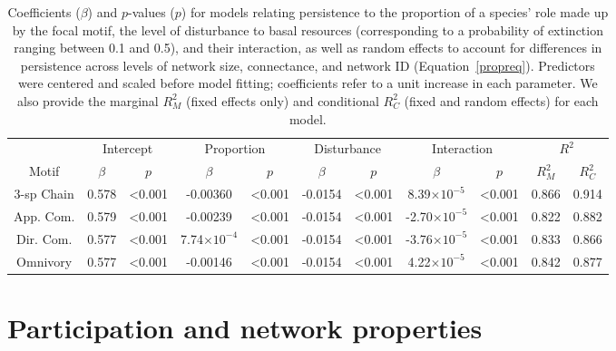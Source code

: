 \documentclass[12pt]{article}
\begin{document}
\begin{spacing}{2.0}
    \begin{table}[h!]
        \centering
        \caption{Coefficients ($\beta$) and $p$-values ($p$) for models relating persistence to the proportion of a species' role made up by the focal motif, the level of disturbance to basal resources (corresponding to a probability of extinction ranging between 0.1 and 0.5), and their interaction, as well as random effects to account for differences in persistence across levels of network size, connectance, and network ID  (Equation~\ref{propreq}). Predictors were centered and scaled before model fitting; coefficients refer to a unit increase in each parameter. We also provide the marginal $R^2_M$ (fixed effects only) and conditional $R^2_C$ (fixed and random effects) for each model.}
        \label{tab:proportion}                \footnotesize
        \begin{tabular}{c|c c | c c | c c | c c | c c |}
        & \multicolumn{2}{c|}{Intercept} & \multicolumn{2}{c|}{Proportion} & \multicolumn{2}{c|}{Disturbance} & \multicolumn{2}{c|}{Interaction} & \multicolumn{2}{c|}{$R^2$} \\
        Motif & $\beta$ & $p$ & $\beta$ & $p$ & $\beta$ & $p$ & $\beta$ & $p$ & $R^2_M$ & $R^2_C$ \\
        \hline
        3-sp Chain & 0.578 & \textless0.001 & -0.00360 & \textless0.001 & -0.0154 & \textless0.001 & 8.39$\times10^{-5}$& \textless0.001 & 0.866 & 0.914 \\
        App. Com. & 0.579 & \textless0.001 & -0.00239 & \textless0.001 & -0.0154 & \textless0.001 & -2.70$\times10^{-5}$ & \textless0.001 & 0.822 & 0.882 \\
        Dir. Com. & 0.577 & \textless0.001 & 7.74$\times10^{-4}$ & \textless0.001 & -0.0154 & \textless0.001 & -3.76$\times10^{-5}$ & \textless0.001 & 0.833 & 0.866 \\
        Omnivory & 0.577 & \textless0.001 & -0.00146 & \textless0.001 & -0.0154 & \textless0.001 & 4.22$\times10^{-5}$ & \textless0.001 & 0.842 & 0.877 \\
        \end{tabular}
    \end{table}        
\clearpage     

\section{Participation and network properties}



\end{spacing}
\end{document}
